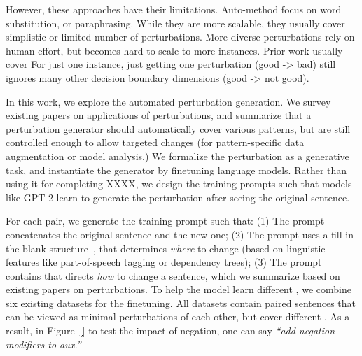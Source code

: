 However, these approaches have their limitations. 
Auto-method focus on word substitution, or paraphrasing. While they are more scalable, they usually cover simplistic or limited number of perturbations.
More diverse perturbations rely on human effort, but becomes hard to scale to more instances.
Prior work usually cover For just one instance, just getting one perturbation (good -> bad) still ignores many other decision boundary dimensions (good -> not good). 

In this work, we explore the automated perturbation generation.
We survey existing papers on applications of perturbations, and summarize that a perturbation generator should automatically cover various patterns, but are still controlled enough to allow targeted changes (for pattern-specific data augmentation or model analysis.)
We formalize the perturbation as a generative task, and instantiate the generator by finetuning language models.
Rather than using it for completing XXXX, we design the training prompts such that models like GPT-2 learn to generate the perturbation after seeing the original sentence.

For each pair, we generate the training prompt such that:
(1) The prompt concatenates the original sentence and the new one;  
(2) The prompt uses a fill-in-the-blank structure~\cite{}, that determines \emph{where} to change (based on linguistic features like part-of-speech tagging or dependency trees);
(3) The prompt contains \tagstrs that directs \emph{how} to change a sentence, which we summarize based on existing papers on perturbations.
To help the model learn different \tagstrs, we combine six existing datasets for the finetuning.
All datasets contain paired sentences that can be viewed as minimal perturbations of each other, but cover different \tagstrs.
As a result, in Figure~\ref{} to test the impact of negation, one can say \emph{``add negation modifiers to aux.''}

